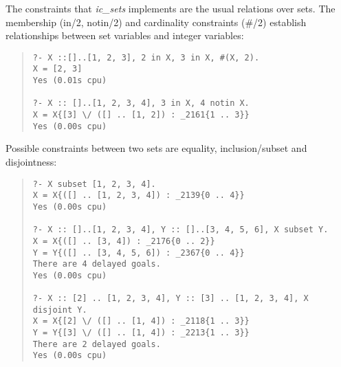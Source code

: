The constraints that {\em ic_sets} implements are the usual relations
over sets.
The membership (in/2, notin/2) and cardinality constraints
(\#/2) establish
relationships between set variables and integer variables:
\begin{quote}\begin{verbatim}
?- X ::[]..[1, 2, 3], 2 in X, 3 in X, #(X, 2).
X = [2, 3]
Yes (0.01s cpu)

?- X :: []..[1, 2, 3, 4], 3 in X, 4 notin X.
X = X{[3] \/ ([] .. [1, 2]) : _2161{1 .. 3}}
Yes (0.00s cpu)
\end{verbatim}\end{quote}
Possible constraints between two sets are equality, inclusion/subset
and disjointness:
\begin{quote}\begin{verbatim}
?- X subset [1, 2, 3, 4].
X = X{([] .. [1, 2, 3, 4]) : _2139{0 .. 4}}
Yes (0.00s cpu)

?- X :: []..[1, 2, 3, 4], Y :: []..[3, 4, 5, 6], X subset Y.
X = X{([] .. [3, 4]) : _2176{0 .. 2}}
Y = Y{([] .. [3, 4, 5, 6]) : _2367{0 .. 4}}
There are 4 delayed goals.
Yes (0.00s cpu)

?- X :: [2] .. [1, 2, 3, 4], Y :: [3] .. [1, 2, 3, 4], X disjoint Y.
X = X{[2] \/ ([] .. [1, 4]) : _2118{1 .. 3}}
Y = Y{[3] \/ ([] .. [1, 4]) : _2213{1 .. 3}}
There are 2 delayed goals.
Yes (0.00s cpu)
\end{verbatim}\end{quote}

